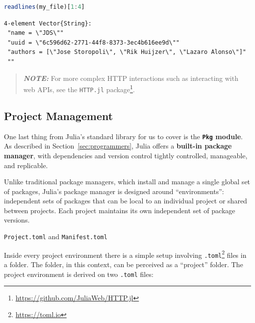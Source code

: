 \documentclass[
  notoc %
]{tufte-book}
\makeatletter
\DeclareRobustCommand{\href}[2]{#2\footnote{\url{#1}}}
\newcommand{\passthrough}[1]{#1}
\renewcommand\subsubsection{%
\@startsection{subsubsection}{3}{\z@ }{-3.25ex\@plus -1ex \@minus -.2ex}{1.5ex \@plus .2ex}{\normalfont \normalsize \bfseries }
}
\makeatother
\begin{document}
\begin{lstlisting}[language=Julia]
readlines(my_file)[1:4]
\end{lstlisting}

\begin{lstlisting}[language=Output]
4-element Vector{String}:
 "name = \"JDS\""
 "uuid = \"6c596d62-2771-44f8-8373-3ec4b616ee9d\""
 "authors = [\"Jose Storopoli\", \"Rik Huijzer\", \"Lazaro Alonso\"]"
 ""
\end{lstlisting}

\begin{quote}
\textbf{\emph{NOTE:}} For more complex HTTP interactions such as
interacting with web APIs, see the
\href{https://github.com/JuliaWeb/HTTP.jl}{\passthrough{\lstinline!HTTP.jl!}
package}.
\end{quote}

\hypertarget{sec:project_management}{%
\subsection{Project Management}\label{sec:project_management}}

One last thing from Julia's standard library for us to cover is the
\textbf{\passthrough{\lstinline!Pkg!} module}. As described in
Section~\ref{sec:programmers}, Julia offers a \textbf{built-in package
manager}, with dependencies and version control tightly controlled,
manageable, and replicable.

Unlike traditional package managers, which install and manage a single
global set of packages, Julia's package manager is designed around
``environments'': independent sets of packages that can be local to an
individual project or shared between projects. Each project maintains
its own independent set of package versions.

\hypertarget{sec:project_management_toml}{%
\subsubsection{\texorpdfstring{\texttt{Project.toml} and
\texttt{Manifest.toml}}{Project.toml and Manifest.toml}}\label{sec:project_management_toml}}

Inside every project environment there is a simple setup involving
\href{https://toml.io}{\passthrough{\lstinline!.toml!}} files in a
folder. The folder, in this context, can be perceived as a ``project''
folder. The project environment is derived on two
\passthrough{\lstinline!.toml!} files:
\end{document}
